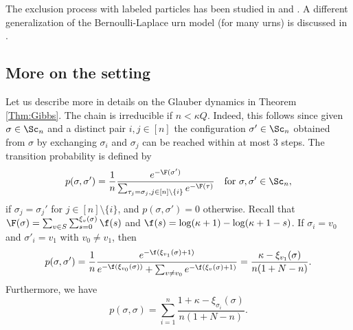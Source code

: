 \documentclass[12pt, reqno]{amsart}
\begin{document}
The exclusion process with labeled particles has been studied in \cite[Theorem 1.2]{LacoinLeblond} and \cite{PatkoPete}.
A different generalization of the Bernoulli-Laplace urn model (for many urns) is discussed in \cite{Scarabotti1997}.

\subsection{More on the setting}\label{Sec:setting}

Let us describe more in details on the Glauber dynamics in Theorem \ref{Thm:Gibbs}.
The chain is irreducible if $n<\kappa Q$.
Indeed, this follows since given $\sigma \in \Sc_n$ and a distinct pair $i, j \in [n]$
the configuration $\sigma' \in \Sc_n$ obtained from $\sigma$ by exchanging $\sigma_i$ and $\sigma_j$ can be reached within at most $3$ steps.
The transition probability is defined by
\[
p(\sigma, \sigma')=\frac{1}{n}\frac{e^{-\F(\sigma')}}{\sum_{\tau_j=\sigma_j, j \in [n]\setminus\{i\}}e^{-\F(\tau)}} \quad \text{for $\sigma, \sigma' \in \Sc_n$},
\]
if $\sigma_j=\sigma_j'$ for $j \in [n]\setminus\{i\}$,
and $p(\sigma, \sigma')=0$ otherwise.
Recall that $\F(\sigma)=\sum_{v \in S}\sum_{s=0}^{\xi_v(\sigma)}\f(s)$ and 
$\f(s)=\log(\kappa+1)-\log(\kappa+1-s)$.
If $\sigma_i=v_0$ and $\sigma'_i=v_1$ with $v_0\neq v_1$,
then
\[
p(\sigma, \sigma')=\frac{1}{n}\frac{e^{-\f(\xi_{v_1}(\sigma)+1)}}{e^{-\f(\xi_{v_0}(\sigma))}+\sum_{v \neq v_0}e^{-\f(\xi_v(\sigma)+1)}}
=\frac{\kappa-\xi_{v_1}(\sigma)}{n(1+N-n)}.
\]
Furthermore,
we have
\[
p(\sigma, \sigma)=\sum_{i=1}^n\frac{1+\kappa-\xi_{\sigma_i}(\sigma)}{n(1+N-n)}.
\]
\end{document}
